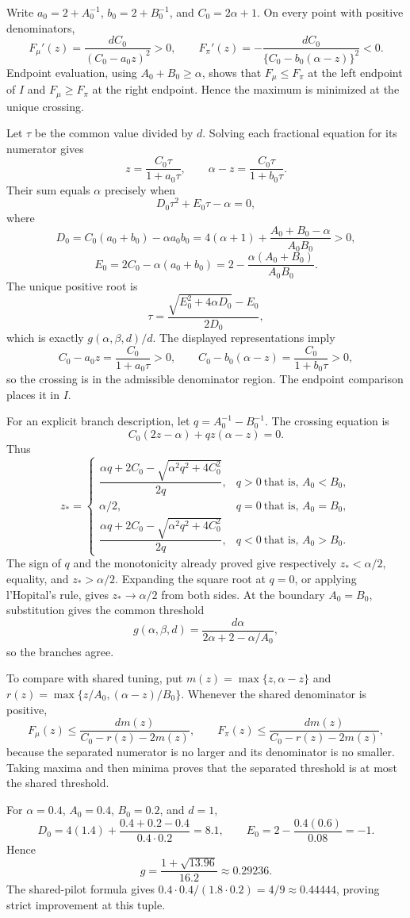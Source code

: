 Write \(a_0=2+A_0^{-1}\), \(b_0=2+B_0^{-1}\), and \(C_0=2\alpha+1\). On every point with positive denominators,
\[
F_\mu'(z)=\frac{dC_0}{(C_0-a_0z)^2}>0,
\qquad
F_\pi'(z)=-\frac{dC_0}{\{C_0-b_0(\alpha-z)\}^2}<0.
\]
Endpoint evaluation, using \(A_0+B_0\ge\alpha\), shows that \(F_\mu\le F_\pi\) at the left endpoint of \(I\) and \(F_\mu\ge F_\pi\) at the right endpoint. Hence the maximum is minimized at the unique crossing.

Let \(\tau\) be the common value divided by \(d\). Solving each fractional equation for its numerator gives
\[
z=\frac{C_0\tau}{1+a_0\tau},
\qquad
\alpha-z=\frac{C_0\tau}{1+b_0\tau}.
\]
Their sum equals \(\alpha\) precisely when
\[
D_0\tau^2+E_0\tau-\alpha=0,
\]
where
\[
D_0=C_0(a_0+b_0)-\alpha a_0b_0
=4(\alpha+1)+\frac{A_0+B_0-\alpha}{A_0B_0}>0,
\]
\[
E_0=2C_0-\alpha(a_0+b_0)
=2-\frac{\alpha(A_0+B_0)}{A_0B_0}.
\]
The unique positive root is
\[
\tau=\frac{\sqrt{E_0^2+4\alpha D_0}-E_0}{2D_0},
\]
which is exactly \(g(\alpha,\beta,d)/d\). The displayed representations imply
\[
C_0-a_0z=\frac{C_0}{1+a_0\tau}>0,
\qquad
C_0-b_0(\alpha-z)=\frac{C_0}{1+b_0\tau}>0,
\]
so the crossing is in the admissible denominator region. The endpoint comparison places it in \(I\).

For an explicit branch description, let \(q=A_0^{-1}-B_0^{-1}\). The crossing equation is
\[
C_0(2z-\alpha)+qz(\alpha-z)=0.
\]
Thus
\[
z_*=
\begin{cases}
\dfrac{\alpha q+2C_0-\sqrt{\alpha^2q^2+4C_0^2}}{2q},&q>0\ \text{that is, }A_0<B_0,\\[6pt]
\alpha/2,&q=0\ \text{that is, }A_0=B_0,\\[6pt]
\dfrac{\alpha q+2C_0-\sqrt{\alpha^2q^2+4C_0^2}}{2q},&q<0\ \text{that is, }A_0>B_0.
\end{cases}
\]
The sign of \(q\) and the monotonicity already proved give respectively \(z_*<\alpha/2\), equality, and \(z_*>\alpha/2\). Expanding the square root at \(q=0\), or applying l'Hopital's rule, gives \(z_*\to\alpha/2\) from both sides. At the boundary \(A_0=B_0\), substitution gives the common threshold
\[
g(\alpha,\beta,d)=\frac{d\alpha}{2\alpha+2-\alpha/A_0},
\]
so the branches agree.

To compare with shared tuning, put \(m(z)=\max\{z,\alpha-z\}\) and \(r(z)=\max\{z/A_0,(\alpha-z)/B_0\}\). Whenever the shared denominator is positive,
\[
F_\mu(z)\le\frac{dm(z)}{C_0-r(z)-2m(z)},
\qquad
F_\pi(z)\le\frac{dm(z)}{C_0-r(z)-2m(z)},
\]
because the separated numerator is no larger and its denominator is no smaller. Taking maxima and then minima proves that the separated threshold is at most the shared threshold.

For \(\alpha=0.4\), \(A_0=0.4\), \(B_0=0.2\), and \(d=1\),
\[
D_0=4(1.4)+\frac{0.4+0.2-0.4}{0.4\cdot0.2}=8.1,
\qquad E_0=2-\frac{0.4(0.6)}{0.08}=-1.
\]
Hence
\[
g=\frac{1+\sqrt{13.96}}{16.2}\approx0.29236.
\]
The shared-pilot formula gives \(0.4\cdot0.4/(1.8\cdot0.2)=4/9\approx0.44444\), proving strict improvement at this tuple.